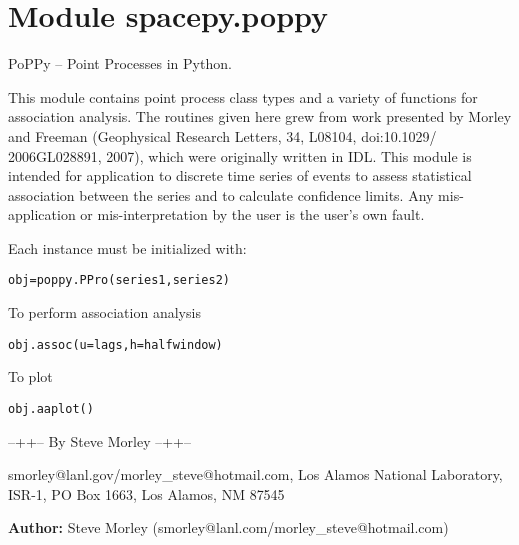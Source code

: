 %
%
%


\section{Module spacepy.poppy}

    \label{spacepy:poppy}
PoPPy -- Point Processes in Python.

This module contains point process class types and a variety of functions 
for association analysis. The routines given here grew from work presented 
by Morley and Freeman (Geophysical Research Letters, 34, L08104, 
doi:10.1029/ 2006GL028891, 2007), which were originally written in IDL. 
This module is intended for application to discrete time series of events 
to assess statistical association between the series and to calculate 
confidence limits. Any mis-application or mis-interpretation by the user is
the user's own fault.

Each instance must be initialized with:

\begin{alltt}
\pysrcprompt{{\textgreater}{\textgreater}{\textgreater} }obj = poppy.PPro(series1, series2)\end{alltt}
To perform association analysis

\begin{alltt}
\pysrcprompt{{\textgreater}{\textgreater}{\textgreater} }obj.assoc(u=lags, h=halfwindow)\end{alltt}
To plot

\begin{alltt}
\pysrcprompt{{\textgreater}{\textgreater}{\textgreater} }obj.aaplot()\end{alltt}
--++-- By Steve Morley --++--

smorley@lanl.gov/morley\_steve@hotmail.com, Los Alamos National Laboratory,
ISR-1, PO Box 1663, Los Alamos, NM 87545

\textbf{Author:} Steve Morley (smorley@lanl.com/morley\_steve@hotmail.com)




